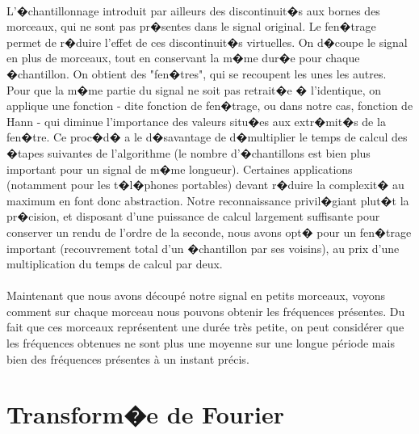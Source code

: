 \paragraph{}
	L'�chantillonnage introduit par ailleurs des discontinuit�s aux bornes des morceaux, qui ne sont pas pr�sentes 
	dans le signal original. Le fen�trage permet de r�duire l'effet de ces discontinuit�s virtuelles. 
	On d�coupe le signal en plus de morceaux, tout en conservant la m�me dur�e pour chaque �chantillon. 
	On obtient des "fen�tres", qui se recoupent les unes les autres. 
	Pour que la m�me partie du signal ne soit pas retrait�e � l'identique, 
	on applique une fonction - dite fonction de fen�trage, ou dans notre cas, fonction de Hann - 
	qui diminue l'importance des valeurs situ�es aux extr�mit�s de la fen�tre. 
	Ce proc�d� a le d�savantage de d�multiplier le temps de calcul des �tapes suivantes de 
	l'algorithme (le nombre d'�chantillons est bien plus important pour un signal de m�me longueur). 
	Certaines applications (notamment pour les t�l�phones portables) devant r�duire la complexit� au 
	maximum en font donc abstraction. Notre reconnaissance privil�giant plut�t la pr�cision, et 
	disposant d'une puissance de calcul largement suffisante pour conserver un rendu de l'ordre de 
	la seconde, nous avons opt� pour un fen�trage important (recouvrement total d'un �chantillon par ses voisins), 
	au prix d'une multiplication du temps de calcul par deux.
\paragraph{}
	Maintenant que nous avons découpé notre signal en petits morceaux, voyons comment sur chaque morceau nous 
	pouvons obtenir les fréquences présentes. Du fait que ces morceaux représentent une durée très petite, on peut
	considérer que les fréquences obtenues ne sont plus une moyenne sur une longue période mais bien des fréquences 
	présentes à un instant précis.

        	\section{Transform�e de Fourier}
